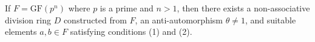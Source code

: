 If $F = \mathrm{GF}(p^n)$ where $p$ is a prime and $n > 1$, then there exists a non-associative division ring $D$ constructed from $F$, an anti-automorphism $\theta \neq 1$, and suitable elements $a, b \in F$ satisfying conditions (1) and (2).